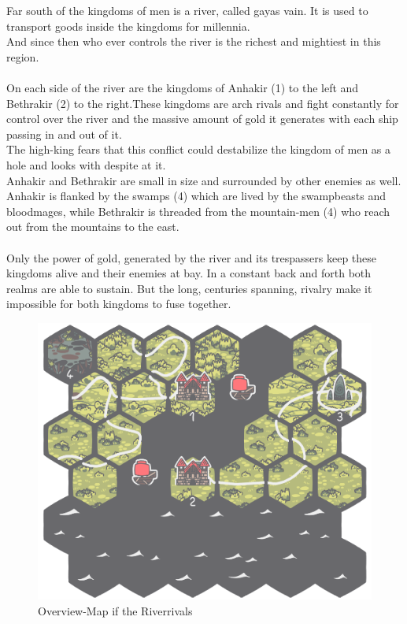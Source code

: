 \documentclass[a5paper,pagesize,10pt,bibtotoc,pointlessnumbers,
normalheadings,DIV=9,twoside=false]{scrbook}
\begin{document}
Far south of the kingdoms of men is a river, called gayas vain. It is used to transport goods inside the kingdoms for millennia.\\
And since then who ever controls the river is the richest and mightiest in this region.\\
\\
On each side of the river are the kingdoms of Anhakir (1) to the left and Bethrakir (2) to the right.These kingdoms are arch rivals and fight constantly for control over the river and the massive amount of gold it generates with each ship passing in and out of it.\\
The high-king fears that this conflict could destabilize the kingdom of men as a hole and looks with despite at it.\\
Anhakir and Bethrakir are small in size and surrounded by other enemies as well.\\
Anhakir is flanked by the swamps (4) which are lived by the swampbeasts and bloodmages, while Bethrakir is threaded from the mountain-men (4) who reach out from the mountains to the east.\\
\\
Only the power of gold, generated by the river and its trespassers keep these kingdoms alive and their enemies at bay. In a constant back and forth both realms are able to sustain. But the long, centuries spanning, rivalry make it impossible for both kingdoms to fuse together.

\begin{figure}[t]
\includegraphics[scale=0.5]{RiverClash}
\centering
\caption{Overview-Map if the Riverrivals}
\end{figure}
\end{document}
